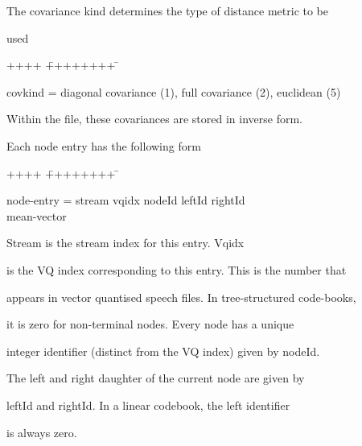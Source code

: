 \noindent


The covariance kind determines the type of distance metric to be


used


{\sf


\begin{tabbing}


++++ \= ++++++++ \=  \kill


\>  covkind =\> diagonal covariance (1), full covariance (2), euclidean (5)


\end{tabbing}


}


\noindent


Within the file, these covariances are stored in inverse form.





Each node entry has the following form


{\sf


\begin{tabbing}


++++ \= ++++++++ \=  \kill


\>  node-entry =\> stream vqidx nodeId leftId rightId \\


\> \> mean-vector \\


\> 


\end{tabbing}


}


\noindent


{\sf Stream} is the stream index for this entry. {\sf Vqidx}


is the VQ index corresponding to this entry.  This is the number that


appears in vector quantised speech files.  In tree-structured code-books,


it is zero for non-terminal nodes. Every node has a unique


integer identifier (distinct from the VQ index) given by {\sf nodeId}.


The left and right daughter of the current node are given by


{\sf leftId} and {\sf rightId}.  In a linear codebook, the left identifier


is always zero.





